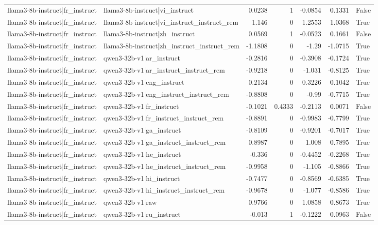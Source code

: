 \begin{table}
\begin{tabular}{l l r r r r l}
llama3-8b-instruct|fr_instruct & llama3-8b-instruct|vi_instruct & 0.0238 & 1 & -0.0854 & 0.1331 & False \\
llama3-8b-instruct|fr_instruct & llama3-8b-instruct|vi_instruct_instruct_rem & -1.146 & 0 & -1.2553 & -1.0368 & True \\
llama3-8b-instruct|fr_instruct & llama3-8b-instruct|zh_instruct & 0.0569 & 1 & -0.0523 & 0.1661 & False \\
llama3-8b-instruct|fr_instruct & llama3-8b-instruct|zh_instruct_instruct_rem & -1.1808 & 0 & -1.29 & -1.0715 & True \\
llama3-8b-instruct|fr_instruct & qwen3-32b-v1|ar_instruct & -0.2816 & 0 & -0.3908 & -0.1724 & True \\
llama3-8b-instruct|fr_instruct & qwen3-32b-v1|ar_instruct_instruct_rem & -0.9218 & 0 & -1.031 & -0.8125 & True \\
llama3-8b-instruct|fr_instruct & qwen3-32b-v1|eng_instruct & -0.2134 & 0 & -0.3226 & -0.1042 & True \\
llama3-8b-instruct|fr_instruct & qwen3-32b-v1|eng_instruct_instruct_rem & -0.8808 & 0 & -0.99 & -0.7715 & True \\
llama3-8b-instruct|fr_instruct & qwen3-32b-v1|fr_instruct & -0.1021 & 0.4333 & -0.2113 & 0.0071 & False \\
llama3-8b-instruct|fr_instruct & qwen3-32b-v1|fr_instruct_instruct_rem & -0.8891 & 0 & -0.9983 & -0.7799 & True \\
llama3-8b-instruct|fr_instruct & qwen3-32b-v1|ga_instruct & -0.8109 & 0 & -0.9201 & -0.7017 & True \\
llama3-8b-instruct|fr_instruct & qwen3-32b-v1|ga_instruct_instruct_rem & -0.8987 & 0 & -1.008 & -0.7895 & True \\
llama3-8b-instruct|fr_instruct & qwen3-32b-v1|he_instruct & -0.336 & 0 & -0.4452 & -0.2268 & True \\
llama3-8b-instruct|fr_instruct & qwen3-32b-v1|he_instruct_instruct_rem & -0.9958 & 0 & -1.105 & -0.8866 & True \\
llama3-8b-instruct|fr_instruct & qwen3-32b-v1|hi_instruct & -0.7477 & 0 & -0.8569 & -0.6385 & True \\
llama3-8b-instruct|fr_instruct & qwen3-32b-v1|hi_instruct_instruct_rem & -0.9678 & 0 & -1.077 & -0.8586 & True \\
llama3-8b-instruct|fr_instruct & qwen3-32b-v1|raw & -0.9766 & 0 & -1.0858 & -0.8673 & True \\
llama3-8b-instruct|fr_instruct & qwen3-32b-v1|ru_instruct & -0.013 & 1 & -0.1222 & 0.0963 & False \\

\end{tabular}
\end{table}
